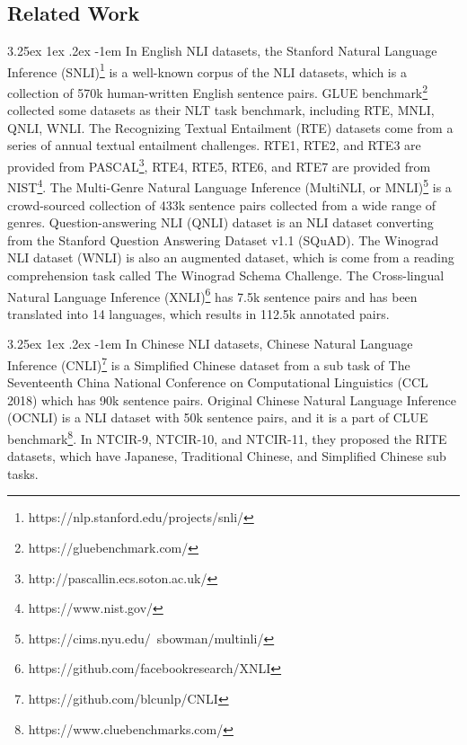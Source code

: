 \documentclass[12pt]{article}
\makeatletter
\renewcommand\paragraph{\@startsection{paragraph}{5}{\z@}%
  {3.25ex \@plus1ex \@minus.2ex}%
  {-1em}%
  {\normalfont\normalsize\bfseries}}
\makeatother
\begin{document}
\begin{CJK*}{UTF8}{bkai}
\begin{spacing}{1.77}
\subsection{Related Work} \label{sec:related_work}
\paragraph{}
In English NLI datasets, the Stanford Natural Language Inference (SNLI)\footnote{https://nlp.stanford.edu/projects/snli/}\cite{snli:emnlp2015} is a well-known corpus of the NLI datasets, which is a collection of 570k human-written English sentence pairs. GLUE benchmark\footnote{https://gluebenchmark.com/} collected some datasets as their NLT task benchmark, including RTE, MNLI, QNLI, WNLI. The Recognizing Textual Entailment (RTE) datasets come from a series of annual textual entailment challenges. RTE1\cite{dagan2006pascal}, RTE2\cite{bar2006second}, and RTE3\cite{giampiccolo2007third} are provided from PASCAL\footnote{http://pascallin.ecs.soton.ac.uk/}, RTE4, RTE5\cite{bentivogli2009fifth}, RTE6, and RTE7 are provided from NIST\footnote{https://www.nist.gov/}. The Multi-Genre Natural Language Inference (MultiNLI, or MNLI)\footnote{https://cims.nyu.edu/~sbowman/multinli/}\cite{N18-1101} is a crowd-sourced collection of 433k sentence pairs collected from a wide range of genres. Question-answering NLI (QNLI)\cite{wang2019glue} dataset is an NLI dataset converting from the Stanford Question Answering Dataset v1.1 (SQuAD)\cite{rajpurkar2016squad}. The Winograd NLI dataset (WNLI) is also an augmented dataset, which is come from a reading comprehension task called The Winograd Schema Challenge\cite{levesque2011winograd}. The Cross-lingual Natural Language Inference (XNLI)\footnote{https://github.com/facebookresearch/XNLI} has 7.5k sentence pairs and has been translated into 14 languages, which results in 112.5k annotated pairs.

\paragraph{}
In Chinese NLI datasets, Chinese Natural Language Inference (CNLI)\footnote{https://github.com/blcunlp/CNLI} is a Simplified Chinese dataset from a sub task of The Seventeenth China National Conference on Computational Linguistics (CCL 2018) which has 90k sentence pairs. Original Chinese Natural Language Inference (OCNLI) is a NLI dataset with 50k sentence pairs, and it is a part of CLUE benchmark\footnote{https://www.cluebenchmarks.com/}. In NTCIR-9\cite{ntcir9rite1}, NTCIR-10\cite{ntcir10rite2}, and NTCIR-11\cite{ntcir11rite-val}, they proposed the RITE datasets, which have Japanese, Traditional Chinese, and Simplified Chinese sub tasks.


\end{spacing}
\end{CJK*}
\end{document}
